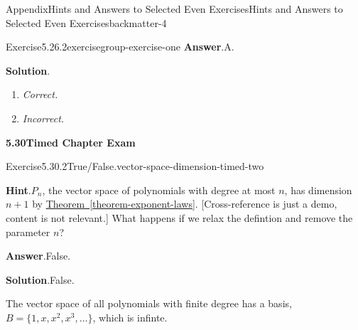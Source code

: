 \documentclass[oneside,10pt,]{book}
\newcommand{\blocktitlefont}{\relax}
\newcommand{\xreffont}{\relax}
\newcommand{\lititle}[1]{{\slshape#1}}
\numberwithin{equation}{section}
\begin{document}
\begin{solutions-chapter}{Appendix}{Hints and Answers to Selected Even Exercises}{}{Hints and Answers to Selected Even Exercises}{}{}{backmatter-4}
\begin{exercisegroup}
\begin{divisionsolutioneg}{Exercise}{5.26.2}{}{exercisegroup-exercise-one}%
\noindent\textbf{\blocktitlefont Answer}.\hypertarget{exercisegroup-exercise-one-2-back}{}\quad{}A.%
\par\smallskip%
\noindent\textbf{\blocktitlefont Solution}.\hypertarget{exercisegroup-exercise-one-3-back}{}\quad{}%
\begin{enumerate}[label={\Alph*.}]
\item{}\lititle{Correct.}\par%
%
\item{}\lititle{Incorrect.}\par%
%
\end{enumerate}
%
\end{divisionsolutioneg}%
\end{exercisegroup}
\par\medskip\noindent
\par\medskip
\noindent\textbf{\Large{}5.30\space\textperiodcentered\space{}Timed Chapter Exam}
\begin{divisionsolution}{Exercise}{5.30.2}{True\slash{}False.}{vector-space-dimension-timed-two}%
\par\smallskip%
\noindent\textbf{\blocktitlefont Hint}.\hypertarget{vector-space-dimension-timed-two-4-back}{}\quad{}\(P_n\), the vector space of polynomials with degree at most \(n\), has dimension \(n+1\) by \hyperref[theorem-exponent-laws]{Theorem~{\xreffont\ref{theorem-exponent-laws}}}.  [Cross-reference is just a demo, content is not relevant.]  What happens if we relax the defintion and remove the parameter \(n\)?%
\par\smallskip%
\noindent\textbf{\blocktitlefont Answer}.\hypertarget{vector-space-dimension-timed-two-5-back}{}\quad{}False.%
\par\smallskip%
\noindent\textbf{\blocktitlefont Solution}.\hypertarget{vector-space-dimension-timed-two-6-back}{}\quad{}False.%
\par
The vector space of all polynomials with finite degree has a basis, \(B = \{1,x,x^2,x^3,\dots\}\), which is infinte.%
\end{divisionsolution}%
\end{solutions-chapter}
%
%
\typeout{************************************************}
\typeout{************************************************}
%
\end{document}
